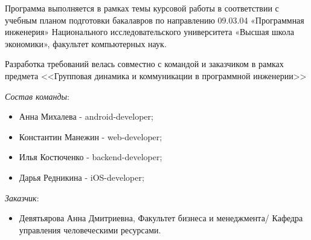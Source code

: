 

Программа выполняется в рамках темы курсовой работы в соответствии с учебным планом подготовки бакалавров по направлению 09.03.04 «Программная инженерия» Национального исследовательского университета «Высшая школа экономики», факультет компьютерных наук.

Разработка требований велась совместно с командой и заказчиком в рамках предмета <<Групповая динамика и коммуникации в программной инженерии>>



\textit{Состав команды}:
\begin{itemize}
	\item Анна Михалева - android-developer;
	\item Константин Манежин - web-developer;
	\item Илья Костюченко - backend-developer;
	\item Дарья Редникина - iOS-developer;
\end{itemize}


\textit{Заказчик}:
\begin{itemize}
	\item Девятьярова Анна Дмитриевна, Факультет бизнеса и менеджмента/ 
	Кафедра управления человеческими ресурсами.
\end{itemize}
\renewcommand{\labelenumi}{\textbf{FR-\arabic{enumi}}.}

\renewcommand{\labelenumii}{\textbf{FR-\arabic{enumi}.\arabic{enumii}}.}

\renewcommand{\labelenumiii}{\arabic{enumiii}.}

